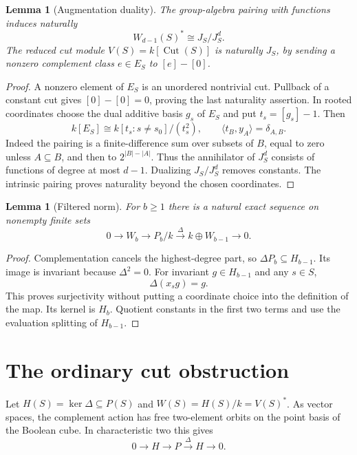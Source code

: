 \documentclass[11pt,a4paper]{article}
\newtheorem{lemma}[theorem]{Lemma}
\theoremstyle{definition}
\theoremstyle{remark}
\newcommand{\Cut}{\operatorname{Cut}}
\begin{document}
\begin{lemma}[Augmentation duality]\label{lem:dual}
The group-algebra pairing with functions induces naturally
\[
 W_{d-1}(S)^*\cong J_S/J_S^d.
\]
The reduced cut module $V(S)=k[\Cut(S)]$ is naturally $J_S$, by sending a nonzero complement class $e\in E_S$ to $[e]-[0]$.
\end{lemma}
\begin{proof}
A nonzero element of $E_S$ is an unordered nontrivial cut. Pullback of a constant cut gives $[0]-[0]=0$, proving the last naturality assertion. In rooted coordinates choose the dual additive basis $g_s$ of $E_S$ and put $t_s=[g_s]-1$. Then
\[
 k[E_S]\cong k[t_s:s\ne s_0]/(t_s^2),\qquad
 \langle t_B,y_A\rangle=\delta_{A,B}.
\]
Indeed the pairing is a finite-difference sum over subsets of $B$, equal to zero unless $A\subseteq B$, and then to $2^{|B|-|A|}$. Thus the annihilator of $J_S^d$ consists of functions of degree at most $d-1$. Dualizing $J_S/J_S^d$ removes constants. The intrinsic pairing proves naturality beyond the chosen coordinates.
\end{proof}

\begin{lemma}[Filtered norm]\label{lem:norm}
For $b\ge1$ there is a natural exact sequence on nonempty finite sets
\begin{equation}\label{eq:norm}
 0\longrightarrow W_b\longrightarrow P_b/k
 \xrightarrow{\Delta}k\oplus W_{b-1}\longrightarrow0.
\end{equation}
\end{lemma}
\begin{proof}
Complementation cancels the highest-degree part, so $\Delta P_b\subseteq H_{b-1}$. Its image is invariant because $\Delta^2=0$. For invariant $g\in H_{b-1}$ and any $s\in S$,
\[
 \Delta(x_sg)=g.
\]
This proves surjectivity without putting a coordinate choice into the definition of the map. Its kernel is $H_b$. Quotient constants in the first two terms and use the evaluation splitting of $H_{b-1}$.
\end{proof}

\section{The ordinary cut obstruction}

Let $H(S)=\ker\Delta\subseteq P(S)$ and $W(S)=H(S)/k=V(S)^*$. As vector spaces, the complement action has free two-element orbits on the point basis of the Boolean cube. In characteristic two this gives
\begin{equation}\label{eq:full-norm}
 0\longrightarrow H\longrightarrow P\xrightarrow{\Delta}H\longrightarrow0.
\end{equation}
\end{document}
